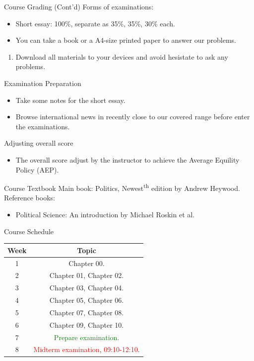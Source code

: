 \documentclass{beamer}
\begin{document}
\begin{frame}{Course Grading (Cont'd)}
Forms of examinations:
\begin{itemize}
\item Short essay: 100\%, separate as 35\%, 35\%, 30\% each.
\item You can take a book or a A4-size printed paper to answer our problems.
\end{itemize}
\begin{enumerate}
\item Download all materials to your devices and avoid hesistate to ask any problems.
\end{enumerate}
\end{frame}
\begin{frame}{Examination Preparation}
\begin{itemize}
\item Take some notes for the short essay.
\item Browse international news in recently close to our covered range before enter the examinations.
\end{itemize}
\begin{block}{Adjusting overall score}
\begin{itemize}
\item The overall score adjust by the instructor to achieve the Average Equility Policy (AEP).
\end{itemize}
\end{block}
\end{frame}
\begin{frame}{Course Textbook}
Main book: Politics, Newest\textsuperscript{th} edition by Andrew Heywood. \\
Reference books:
\begin{itemize}
\item Political Science: An introduction by Michael Roskin et al.
\end{itemize}
\end{frame}
\begin{frame}{Course Schedule}
\begin{center}
\begin{tabular}{|c|c|}
\hline
Week & Topic \\
\hline
1 & Chapter 00.\\
\hline
2 & Chapter 01, Chapter 02.\\
\hline
3 & Chapter 03, Chapter 04.\\
\hline
4 & Chapter 05, Chapter 06.\\
\hline
5 & Chapter 07, Chapter 08.\\
\hline
6 & Chapter 09, Chapter 10.\\
\hline
7 & \textcolor{Green}{Prepare examination}.\\
\hline
8 & \textcolor{red}{Midterm examination}, \textcolor{red}{09:10-12:10}.\\
\hline
\end{tabular}
\end{center}
\end{frame}
\end{document}
